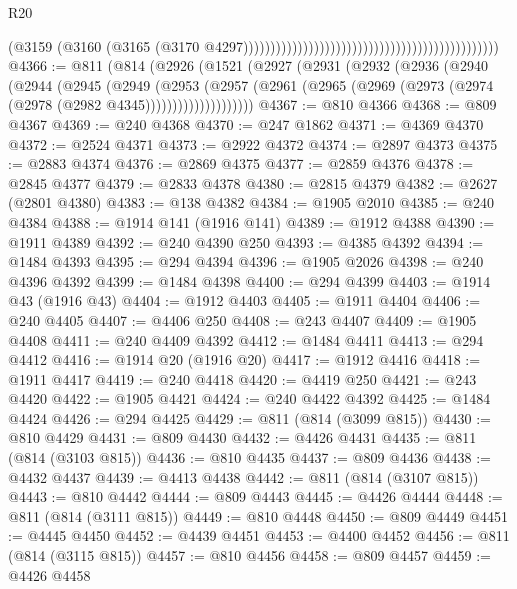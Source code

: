 \begin{lexlean}{R20}
\begin{coremodule}
{                                                                                          (@3159
                                                                                            (@3160
                                                                                              (@3165
                                                                                                (@3170
                                                                                                  @4297)))))))))))))))))))))))))))))))))))))))))))))))
@4366 := @811
    (@814
      (@2926
        (@1521
          (@2927
            (@2931
              (@2932
                (@2936
                  (@2940
                    (@2944
                      (@2945
                        (@2949
                          (@2953
                            (@2957
                              (@2961
                                (@2965 (@2969 (@2973 (@2974 (@2978 (@2982 @4345))))))))))))))))))))
@4367 := @810 @4366
@4368 := @809 @4367
@4369 := @240 @4368
@4370 := @247 @1862
@4371 := @4369 @4370
@4372 := @2524 @4371
@4373 := @2922 @4372
@4374 := @2897 @4373
@4375 := @2883 @4374
@4376 := @2869 @4375
@4377 := @2859 @4376
@4378 := @2845 @4377
@4379 := @2833 @4378
@4380 := @2815 @4379
@4382 := @2627 (@2801 @4380)
@4383 := @138 @4382
@4384 := @1905 @2010
@4385 := @240 @4384
@4388 := @1914 @141 (@1916 @141)
@4389 := @1912 @4388
@4390 := @1911 @4389
@4392 := @240 @4390 @250
@4393 := @4385 @4392
@4394 := @1484 @4393
@4395 := @294 @4394
@4396 := @1905 @2026
@4398 := @240 @4396 @4392
@4399 := @1484 @4398
@4400 := @294 @4399
@4403 := @1914 @43 (@1916 @43)
@4404 := @1912 @4403
@4405 := @1911 @4404
@4406 := @240 @4405
@4407 := @4406 @250
@4408 := @243 @4407
@4409 := @1905 @4408
@4411 := @240 @4409 @4392
@4412 := @1484 @4411
@4413 := @294 @4412
@4416 := @1914 @20 (@1916 @20)
@4417 := @1912 @4416
@4418 := @1911 @4417
@4419 := @240 @4418
@4420 := @4419 @250
@4421 := @243 @4420
@4422 := @1905 @4421
@4424 := @240 @4422 @4392
@4425 := @1484 @4424
@4426 := @294 @4425
@4429 := @811 (@814 (@3099 @815))
@4430 := @810 @4429
@4431 := @809 @4430
@4432 := @4426 @4431
@4435 := @811 (@814 (@3103 @815))
@4436 := @810 @4435
@4437 := @809 @4436
@4438 := @4432 @4437
@4439 := @4413 @4438
@4442 := @811 (@814 (@3107 @815))
@4443 := @810 @4442
@4444 := @809 @4443
@4445 := @4426 @4444
@4448 := @811 (@814 (@3111 @815))
@4449 := @810 @4448
@4450 := @809 @4449
@4451 := @4445 @4450
@4452 := @4439 @4451
@4453 := @4400 @4452
@4456 := @811 (@814 (@3115 @815))
@4457 := @810 @4456
@4458 := @809 @4457
@4459 := @4426 @4458
}
\end{coremodule}
\end{lexlean}
